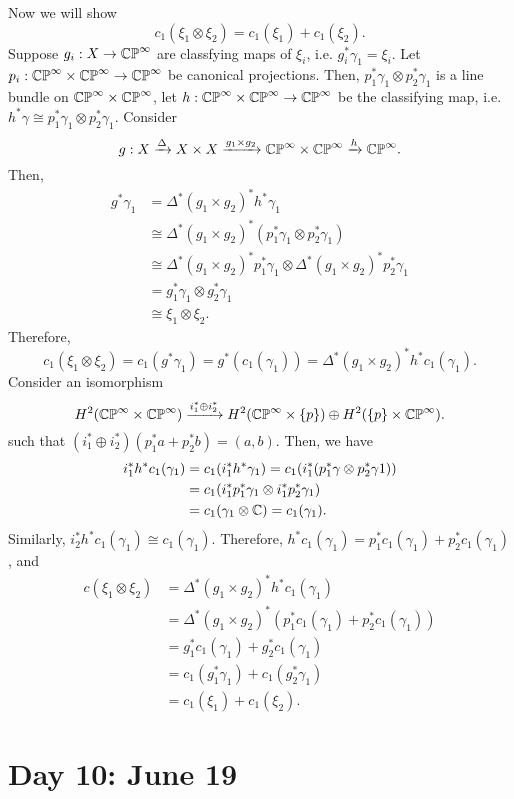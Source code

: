 \documentclass{../../../small}
\begin{document}
Now we will show
\[c_1(\xi_1\otimes\xi_2)=c_1(\xi_1)+c_1(\xi_2).\]
Suppose $g_i:X\to \mathbb{CP}^\infty$ are classfying maps of $\xi_i$, i.e. $g_i^*\gamma_1=\xi_i$.
Let $p_i:\mathbb{CP}^\infty\times\mathbb{CP}^\infty\to\mathbb{CP}^\infty$ be canonical projections.
Then, $p_1^*\gamma_1\otimes p_2^*\gamma_1$ is a line bundle on $\mathbb{CP}^\infty\times\mathbb{CP}^\infty$, let $h:\mathbb{CP}^\infty\times\mathbb{CP}^\infty\to\mathbb{CP}^\infty$ be the classifying map, i.e. $h^*\gamma\cong p_1^*\gamma_1\otimes p_2^*\gamma_1$.
Consider
\[g:X\xrightarrow{\Delta}X\times X\xrightarrow{g_1\times g_2}\mathbb{CP}^\infty\times\mathbb{CP}^\infty\xrightarrow{h}\mathbb{CP}^\infty.\]
Then,
\begin{align*}
g^*\gamma_1
&=\Delta^*(g_1\times g_2)^*h^*\gamma_1\\
&\cong\Delta^*(g_1\times g_2)^*(p_1^*\gamma_1\otimes p_2^*\gamma_1)\\
&\cong\Delta^*(g_1\times g_2)^*p_1^*\gamma_1\otimes\Delta^*(g_1\times g_2)^*p_2^*\gamma_1\\
&=g_1^*\gamma_1\otimes g_2^*\gamma_1\\
&\cong\xi_1\otimes\xi_2.
\end{align*}
Therefore,
\[c_1(\xi_1\otimes\xi_2)=c_1(g^*\gamma_1)=g^*(c_1(\gamma_1))=\Delta^*(g_1\times g_2)^*h^*c_1(\gamma_1).\]
Consider an isomorphism
\[H^2(\mathbb{CP}^\infty\times\mathbb{CP}^\infty)\xrightarrow{i_1^*\oplus i_2^*}H^2(\mathbb{CP}^\infty\times\{p\})\oplus H^2(\{p\}\times\mathbb{CP}^\infty).\]
such that $(i_1^*\oplus i_2^*)(p_1^*a+p_2^*b)=(a,b)$.
Then, we have
\begin{align*}
i_1^*h^*c_1(\gamma_1)
&=c_1(i_1^*h^*\gamma_1)=c_1(i_1^*(p_1^*\gamma\otimes p_2^*\gamma1))\\
&=c_1(i_1^*p_1^*\gamma_1\otimes i_1^*p_2^*\gamma_1)\\
&=c_1(\gamma_1\otimes\mathbb{C})=c_1(\gamma_1).
\end{align*}
Similarly, $i_2^*h^*c_1(\gamma_1)\cong c_1(\gamma_1)$.
Therefore, $h^*c_1(\gamma_1)=p_1^*c_1(\gamma_1)+p_2^*c_1(\gamma_1)$, and
\begin{align*}
c(\xi_1\otimes\xi_2)
&=\Delta^*(g_1\times g_2)^*h^*c_1(\gamma_1)\\
&=\Delta^*(g_1\times g_2)^*(p_1^*c_1(\gamma_1)+p_2^*c_1(\gamma_1))\\
&=g_1^*c_1(\gamma_1)+g_2^*c_1(\gamma_1)\\
&=c_1(g_1^*\gamma_1)+c_1(g_2^*\gamma_1)\\
&=c_1(\xi_1)+c_1(\xi_2).
\end{align*}



\newpage
\section{Day 10: June 19}
\end{document}
